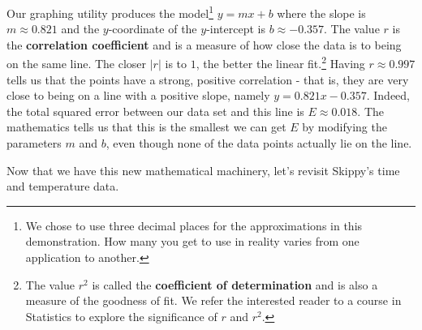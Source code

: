 \documentclass{ximera}
\begin{document}
\enlargethispage{.25in}

Our graphing utility produces the model\footnote{We chose to use three decimal places for the approximations in this demonstration.  How many you get to use in reality varies from one application to another.} $y=mx+b$ where the slope is $m \approx 0.821$ and the $y$-coordinate of the $y$-intercept is $b \approx -0.357$.  The value $r$ is the \textbf{correlation coefficient} and is a measure of how close the data is to being on the same line.  The closer $|r|$ is to $1$, the better the linear fit.\footnote{The value $r^2$ is called the \textbf{coefficient of determination} and is also a measure of the goodness of fit. We refer the interested reader to a course in Statistics to explore the significance of $r$ and $r^2$.} Having $r \approx 0.997$ tells us that the points have a strong, positive correlation - that is, they are very close to being on a line with a positive slope, namely $y = 0.821x - 0.357$.   Indeed, the total squared error between our data set and this line is $E \approx 0.018$. The mathematics tells us that this is the smallest we can get $E$ by modifying the parameters $m$ and $b$, even though none of the data points actually lie on the line.  



Now that we have this new mathematical machinery, let's revisit Skippy's time and temperature data.
  
\end{document}
